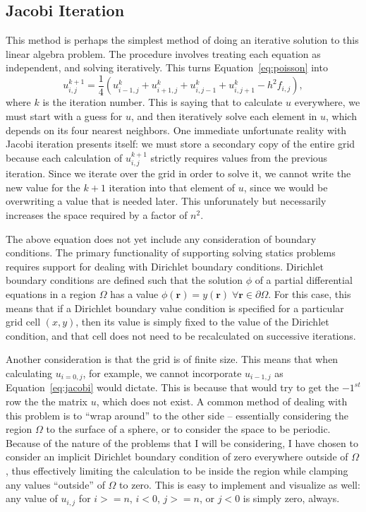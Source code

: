 \subsection{Jacobi Iteration}
This method is perhaps the simplest method of doing an iterative solution to this linear algebra problem. The procedure
involves treating each equation as independent, and solving iteratively. This turns Equation~\ref{eq:poisson} into\cite{poisson-relax}
\begin{equation} \label{eq:jacobi}
u_{i,j}^{k+1} = \frac{1}{4}(u_{i-1,j}^{k} + u_{i+1,j}^{k} + u_{i,j-1}^{k} + u_{i,j+1}^{k} - h^2f_{i,j}),
\end{equation}
where $k$ is the iteration number. This is saying that to calculate $u$ everywhere, we must start with a guess for $u$,
and then iteratively solve each element in $u$, which depends on its four nearest neighbors. One immediate unfortunate
reality with Jacobi iteration presents itself: we must store a secondary copy of the entire grid because each calculation
of $u_{i,j}^{k+1}$ strictly requires values from the previous iteration. Since we iterate over the grid in order to solve
it, we cannot write the new value for the $k+1$ iteration into that element of $u$, since we would be overwriting a value
that is needed later. This unforunately but necessarily increases the space required by a factor of $n^2$.

The above equation does not yet include any consideration of boundary conditions. The primary functionality of supporting solving statics problems requires support for dealing with
Dirichlet boundary conditions. Dirichlet boundary conditions are defined such that the solution $\phi$ of a partial
differential equations in a region $\Omega$ has a value $\phi(\mathbf{r}) = y(\mathbf{r}) \; \forall \mathbf{r} \in \partial \Omega$.
For this case, this means that if a Dirichlet boundary value condition is specified for a particular grid cell $(x,y)$,
then its value is simply fixed to the value of the Dirichlet condition, and that cell does not need to be recalculated on
successive iterations.

Another consideration is that the grid is of finite size. This means that when calculating $u_{i=0,j}$, for example, we cannot
incorporate $u_{i-1,j}$ as Equation~\ref{eq:jacobi} would dictate. This is because that would try to get the $-1^{st}$ row the
the matrix $u$, which does not exist. A common method of dealing with this problem is to ``wrap around'' to the other side --
essentially considering the region $\Omega$ to the surface of a sphere, or to consider the space to be periodic. Because of
the nature of the problems that I will be considering, I have chosen to consider an implicit Dirichlet boundary condition
of zero everywhere outside of $\Omega$, thus effectively limiting the calculation to be inside the region while clamping any
values ``outside'' of $\Omega$ to zero. This is easy to implement and visualize as well: any value of $u_{i,j}$ for $i >= n$,
$i < 0$, $j >= n$, or $j < 0$ is simply zero, always.

